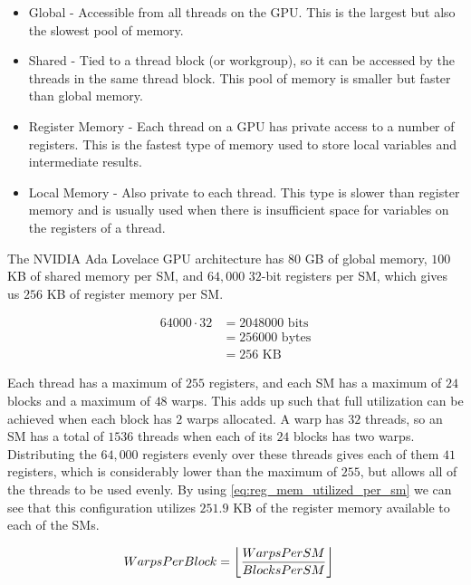 \begin{itemize}
  \item Global - Accessible from all threads on the GPU. This is the largest but also the slowest pool of memory.
  \item Shared - Tied to a thread block (or workgroup), so it can be accessed by the threads in the same thread block. This pool of memory is smaller but faster than global memory.
  \item Register Memory - Each thread on a GPU has private access to a number of registers. This is the fastest type of memory used to store local variables and intermediate results.
  \item Local Memory - Also private to each thread. This type is slower than register memory and is usually used when there is insufficient space for variables on the registers of a thread.
\end{itemize}


The NVIDIA Ada Lovelace GPU architecture\cite{nvidia-ada-tuning-guide} has $80$ GB of global memory, $100$ KB of shared memory per SM, and $64,000$ $32$-bit registers per SM, which gives us $256$ KB of register memory per SM.

\begin{equation}
\begin{split}
  64000 \cdot 32 &= 2048000 \text{ bits}\\
  &= 256000 \text{ bytes}\\
  &= 256 \text{ KB}
\end{split}
\end{equation}

Each thread has a maximum of $255$ registers, and each SM has a maximum of $24$ blocks and a maximum of $48$ warps. This adds up such that full utilization can be achieved when each block has $2$ warps allocated. A warp has $32$ threads, so an SM has a total of $1536$ threads when each of its $24$ blocks has two warps.
Distributing the $64,000$ registers evenly over these threads gives each of them $41$ registers, which is considerably lower than the maximum of $255$, but allows all of the threads to be used evenly. By using \autoref{eq:reg_mem_utilized_per_sm} we can see that this configuration utilizes $251.9$ KB of the register memory available to each of the SMs.

\begin{equation}
\begin{split}
  WarpsPerBlock &= \floor*{\frac{WarpsPerSM}{BlocksPerSM}}
\end{split}
\end{equation}

